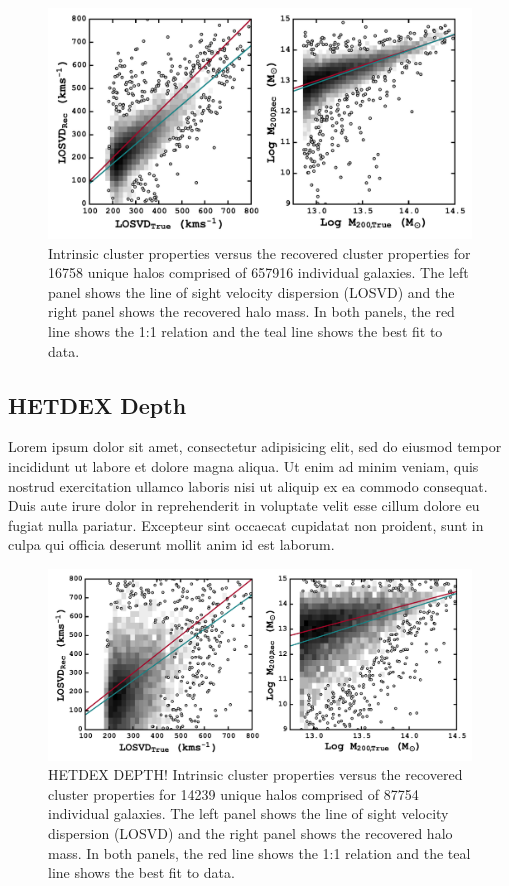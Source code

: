 \documentclass[apj, revtex4]{emulateapj}
\begin{document}
\begin{figure} 
	\includegraphics[width=\textwidth]{fullKnowledge.pdf} 
	\caption{Intrinsic cluster properties versus the recovered cluster properties for 16758 unique halos comprised of 657916 individual galaxies. The left panel shows the line of sight velocity dispersion (LOSVD) and the right panel shows the recovered halo mass. In both panels, the red line shows the 1:1 relation and the teal line shows the best fit to data.} 
	\label{fig:full} 
\end{figure}

\subsection{HETDEX Depth}

Lorem ipsum dolor sit amet, consectetur adipisicing elit, sed do eiusmod tempor incididunt ut labore et dolore magna aliqua. Ut enim ad minim veniam, quis nostrud exercitation ullamco laboris nisi ut aliquip ex ea commodo consequat. Duis aute irure dolor in reprehenderit in voluptate velit esse cillum dolore eu fugiat nulla pariatur. Excepteur sint occaecat cupidatat non proident, sunt in culpa qui officia deserunt mollit anim id est laborum.

\begin{figure} 
	\includegraphics[width=\textwidth]{hetdexDepth.pdf} 
	\caption{HETDEX DEPTH! Intrinsic cluster properties versus the recovered cluster properties for 14239 unique halos comprised of 87754 individual galaxies. The left panel shows the line of sight velocity dispersion (LOSVD) and the right panel shows the recovered halo mass. In both panels, the red line shows the 1:1 relation and the teal line shows the best fit to data.} 
	\label{fig:hetdexDepth} 
\end{figure}
\end{document}
